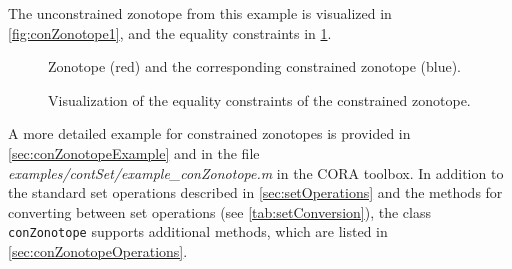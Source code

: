 The unconstrained zonotope from this example is visualized in \cref{fig:conZonotope1}, and the equality constraints in \cref{fig:conZonotope2}.

\begin{figure}[h!tb]
\begin{minipage}{0.45\columnwidth}
  \centering
  \caption{Zonotope (red) and the corresponding constrained zonotope (blue).}
  \label{fig:conZonotope1}
\end{minipage}
\hspace{0.08\columnwidth}
\begin{minipage}{0.45\columnwidth}
  \centering
  \caption{Visualization of the equality constraints of the constrained zonotope.}
  \label{fig:conZonotope2}
\end{minipage}
\end{figure}

A more detailed example for constrained zonotopes is provided in \cref{sec:conZonotopeExample} and in the file \textit{examples/contSet/example\_conZonotope.m} in the CORA toolbox. In addition to the standard set operations described in \cref{sec:setOperations} and the methods for converting between set operations (see \cref{tab:setConversion}), the class \texttt{conZonotope} supports additional methods, which are listed in \cref{sec:conZonotopeOperations}.